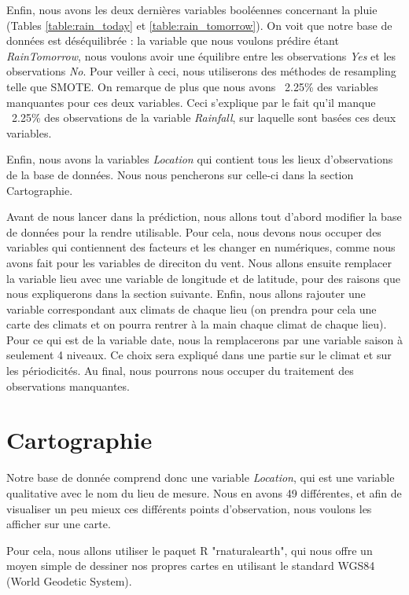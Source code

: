 \documentclass{article}
\begin{document}
Enfin, nous avons les deux dernières variables booléennes concernant la pluie (Tables \ref{table:rain_today} et \ref{table:rain_tomorrow}). On voit que notre base de données est déséquilibrée : la variable que nous voulons prédire étant \emph{RainTomorrow}, nous voulons avoir une équilibre entre les observations \emph{Yes} et les observations \emph{No}. Pour veiller à ceci, nous utiliserons des méthodes de resampling telle que SMOTE. 
On remarque de plus que nous avons ~2.25\% des variables manquantes pour ces deux variables. Ceci s'explique par le fait qu'il manque ~2.25\% des observations de la variable \emph{Rainfall}, sur laquelle sont basées ces deux variables.

Enfin, nous avons la variables \emph{Location} qui contient tous les lieux d'observations de la base de données. Nous nous pencherons sur celle-ci dans la section Cartographie. 

Avant de nous lancer dans la prédiction, nous allons tout d'abord modifier la base de données pour la rendre utilisable. Pour cela, nous devons nous occuper des variables qui contiennent des facteurs et les changer en numériques, comme nous avons fait pour les variables de direciton du vent. Nous allons ensuite remplacer la variable lieu avec une variable de longitude et de latitude, pour des raisons que nous expliquerons dans la section suivante. Enfin, nous allons rajouter une variable correspondant aux climats de chaque lieu (on prendra pour cela une carte des climats et on pourra rentrer à la main chaque climat de chaque lieu). Pour ce qui est de la variable date, nous la remplacerons par une variable saison à seulement 4 niveaux. Ce choix sera expliqué dans une partie sur le climat et sur les périodicités. Au final, nous pourrons nous occuper du traitement des observations manquantes. 

\section{Cartographie}

Notre base de donnée comprend donc une variable \emph{Location}, qui est une variable qualitative avec le nom du lieu de mesure. Nous en avons 49 différentes, et afin de visualiser un peu mieux ces différents points d'observation, nous voulons les afficher sur une carte. 

Pour cela, nous allons utiliser le paquet R "rnaturalearth", qui nous offre un moyen simple de dessiner nos propres cartes en utilisant le standard WGS84 (World Geodetic System).
\end{document}
